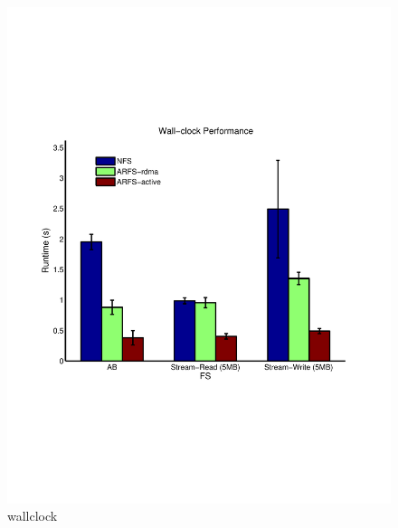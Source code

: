 \documentclass[10pt]{article}
\begin{document}
\begin{figure}
  \centering
\includegraphics[scale=0.5, trim = 0 200 0 200]{../../results/matlab/wallclock.pdf}
  \caption{wallclock}\label{wallclock}
\end{figure}
\end{document}
